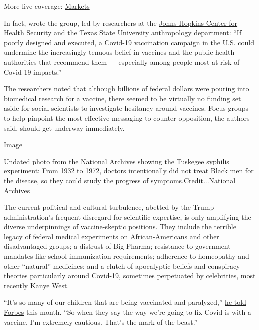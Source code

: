 More live coverage:
\href{https://www.nytimes.com/live/2020/08/03/business/stock-market-today-coronavirus?action=click\&pgtype=Article\&state=default\&region=MAIN_CONTENT_1\&context=storylines_live_updates}{Markets}

In fact, wrote the group, led by researchers at the
\href{https://www.centerforhealthsecurity.org/}{Johns Hopkins Center for
Health Security} and the Texas State University anthropology department:
``If poorly designed and executed, a Covid-19 vaccination campaign in
the U.S. could undermine the increasingly tenuous belief in vaccines and
the public health authorities that recommend them --- especially among
people most at risk of Covid-19 impacts.''

The researchers noted that although billions of federal dollars were
pouring into biomedical research for a vaccine, there seemed to be
virtually no funding set aside for social scientists to investigate
hesitancy around vaccines. Focus groups to help pinpoint the most
effective messaging to counter opposition, the authors said, should get
underway immediately.

Image

Undated photo from the National Archives showing the Tuskegee syphilis
experiment: From 1932 to 1972, doctors intentionally did not treat Black
men for the disease, so they could study the progress of
symptoms.Credit...National Archives

The current political and cultural turbulence, abetted by the Trump
administration's frequent disregard for scientific expertise, is only
amplifying the diverse underpinnings of vaccine-skeptic positions. They
include the terrible legacy of federal medical experiments on
African-Americans and other disadvantaged groups; a distrust of Big
Pharma; resistance to government mandates like school immunization
requirements; adherence to homeopathy and other ``natural'' medicines;
and a clutch of apocalyptic beliefs and conspiracy theories particularly
around Covid-19, sometimes perpetuated by celebrities, most recently
Kanye West.

``It's so many of our children that are being vaccinated and
paralyzed,''
\href{https://www.forbes.com/sites/randalllane/2020/07/08/kanye-west-says-hes-done-with-trump-opens-up-about-white-house-bid-damaging-biden-and-everything-in-between/\#6774579e47aa}{he
told Forbes} this month. ``So when they say the way we're going to fix
Covid is with a vaccine, I'm extremely cautious. That's the mark of the
beast.''

